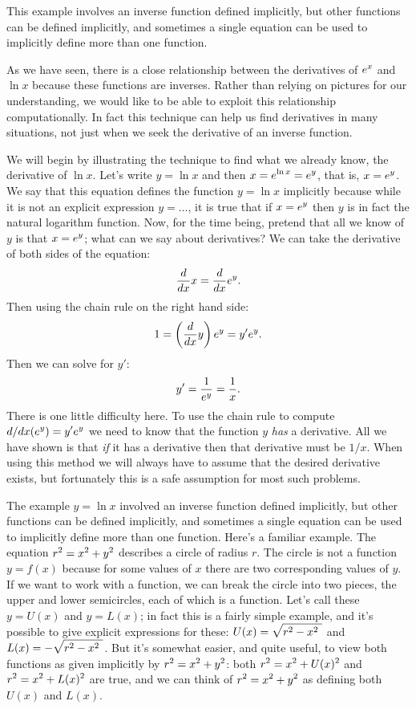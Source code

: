 This example involves an inverse function defined implicitly,
but other functions can be defined implicitly, and sometimes a single
equation can be used to implicitly define more than one
function. 
\elselatetranscendentals

As we have seen, there is a close relationship 
between the derivatives of $\displaystyle e^x$ and $\ln x$ because these functions
are inverses. Rather than relying on pictures for our understanding,
we would like to be able to exploit this relationship
computationally.  In fact this technique can help us find derivatives
in many situations, not just when we seek the derivative of an inverse
function. 

We will begin by illustrating the technique to find what we already
know, the derivative of $\ln x$. Let's write $y=\ln x$ and then
$\displaystyle x=e^{\ln x}=e^y$, that is, $\displaystyle x=e^y$. We say that this equation
defines the function $y=\ln x$ 
implicitly
because while it is not an explicit expression $y=\ldots$, it is true
that if $\displaystyle x=e^y$ then $y$ is in fact the natural logarithm
function. Now, for the time being, pretend that all we know of $y$ is
that $\displaystyle x=e^y$; what can we say about derivatives? We can take the
derivative of both sides of the equation:
$${d\over dx}x={d\over dx}e^y.$$
Then using the chain rule on the right hand side:
$$1 = \left({d\over dx}y\right) e^y = y'e^y.$$
Then we can solve for $y'$:
$$y'={1\over e^y} = {1\over x}.$$
There is one little difficulty here. To use the chain rule to compute 
$\displaystyle d/dx(e^y)=y'e^y$ we need to know that the function $y$ {\em has\/} a
derivative. All we have shown is that {\em if\/} it has a derivative
then that derivative must be $1/x$. When using this method we will
always have to assume that the desired derivative exists, but
fortunately this is a safe assumption for most such problems. 

The example $y=\ln x$ involved an inverse function defined implicitly,
but other functions can be defined implicitly, and sometimes a single
equation can be used to implicitly define more than one
function. 
\filatetranscendentals Here's a familiar example. 
The equation $\displaystyle r^2=x^2+y^2$
describes a circle of radius $r$. The circle is not a function
$y=f(x)$ because for some values of $x$ there are two corresponding
values of $y$. If we want to work with a function, we can break the
circle into two pieces, the upper and lower semicircles, each of which
is a function. Let's call these $y=U(x)$ and $y=L(x)$; in fact this is
a fairly simple example, and it's possible to give explicit
expressions for these: $\displaystyle U(x)=\sqrt{r^2-x^2\ }$ and
$\displaystyle L(x)=-\sqrt{r^2-x^2\ }$.  But it's somewhat easier, and quite useful,
to view both functions as given implicitly by $\displaystyle r^2=x^2+y^2$: both
$\displaystyle r^2=x^2+U(x)^2$ and $\displaystyle r^2=x^2+L(x)^2$ are true, and we can think of 
$\displaystyle r^2=x^2+y^2$ as defining both $U(x)$ and $L(x)$.

